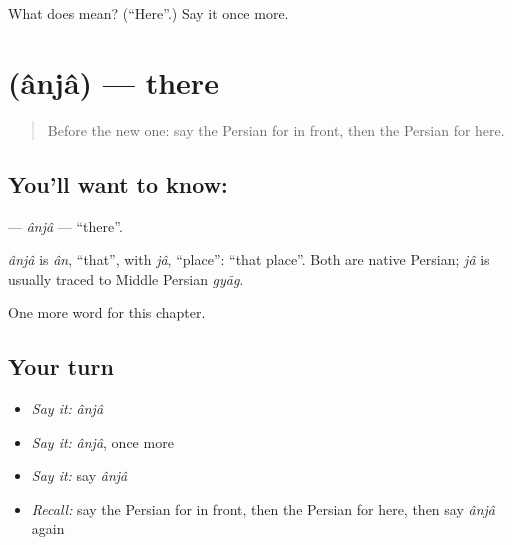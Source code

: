 \begin{tcolorbox}[breakable,colback=teal!4,colframe=teal!35!black,title={Before you move on}]
What does  mean? (\textquotedblleft{}Here\textquotedblright{}.) Say it once more.
\end{tcolorbox}
\section[\texorpdfstring{\fa{آنجا} (ânjâ)}{آنجا (ânjâ)}]{ (ânjâ) — there}

\label{lesson:FA-C69-anja}



\begin{quote}
Before the new one: say the Persian for in front, then the Persian for here.
\end{quote}

\subsection*{You'll want to know: }
\textbf{} — \emph{ânjâ} — \textquotedblleft{}there\textquotedblright{}.

\begin{cousinweb}
\emph{ânjâ} is \emph{ân}, \textquotedblleft{}that\textquotedblright{}, with \emph{jâ}, \textquotedblleft{}place\textquotedblright{}: \textquotedblleft{}that place\textquotedblright{}. Both are native Persian; \emph{jâ} is usually traced to Middle Persian \emph{gyāg}.
\end{cousinweb}

\begin{grammarlens}[title={What you've built}]
One more word for this chapter.
\end{grammarlens}

\subsection*{Your turn}
\begin{itemize}
\raggedright
  \item \emph{Say it:} \emph{ânjâ}
  \item \emph{Say it:} \emph{ânjâ}, once more
  \item \emph{Say it:} say \emph{ânjâ}
  \item \emph{Recall:} say the Persian for in front, then the Persian for here, then say \emph{ânjâ} again
\end{itemize}


